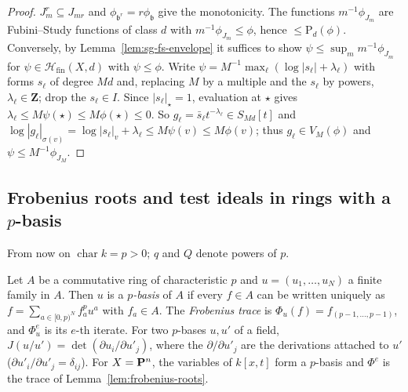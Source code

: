 \begin{proof}
$J_m^r\subseteq J_{mr}$ and $\phi_{\mathfrak b^r}=r\phi_{\mathfrak b}$ give the monotonicity. The functions $m^{-1}\phi_{J_m}$ are Fubini--Study functions of
class $d$ with $m^{-1}\phi_{J_m}\le\phi$, hence $\le\mathrm P_d(\phi)$. Conversely, by Lemma~\ref{lem:sg-fs-envelope} it suffices to show
$\psi\le\sup_mm^{-1}\phi_{J_m}$ for $\psi\in\mathcal H_{\mathrm{fin}}(X,d)$ with $\psi\le\phi$. Write $\psi=M^{-1}\max_\ell(\log|s_\ell|+\lambda_\ell)$ with forms
$s_\ell$ of degree $Md$ and, replacing $M$ by a multiple and the $s_\ell$ by powers, $\lambda_\ell\in\mathbf{Z}$; drop the $s_\ell\in I$. Since
$|s_\ell|_\star=1$, evaluation at $\star$ gives $\lambda_\ell\le M\psi(\star)\le M\phi(\star)\le0$. So $g_\ell=\bar s_\ell t^{-\lambda_\ell}\in S_{Md}[t]$ and
$\log|g_\ell|_{\sigma(v)}=\log|s_\ell|_v+\lambda_\ell\le M\psi(v)\le M\phi(v)$; thus $g_\ell\in V_M(\phi)$ and $\psi\le M^{-1}\phi_{J_M}$.
\end{proof}

\subsection{Frobenius roots and test ideals in rings with a \texorpdfstring{$p$}{p}-basis}\label{subsec:sg-pbasis}

From now on $\operatorname{char}k=p>0$; $q$ and $Q$ denote powers of $p$.

\begin{convention}\label{conv:sg-pbasis}
\leanok
{}
Let $A$ be a commutative ring of characteristic $p$ and $u=(u_1,\dots,u_N)$ a finite family in $A$. Then $u$ is a \emph{$p$-basis}
of $A$ if every $f\in A$ can be written uniquely as $f=\sum_{a\in[0,p)^N}f_a^pu^a$ with $f_a\in A$. The \emph{Frobenius trace} is
$\Phi_u(f)=f_{(p-1,\dots,p-1)}$, and $\Phi^e_u$ is its $e$-th iterate. For two $p$-bases $u,u'$ of a field, $J(u/u')=\det(\partial u_i/\partial u'_j)$,
where the $\partial/\partial u'_j$ are the derivations attached to $u'$ ($\partial u'_i/\partial u'_j=\delta_{ij}$). For $X=\mathbf{P}^n$, the variables of
$k[x,t]$ form a $p$-basis and $\Phi^e$ is the trace of Lemma~\ref{lem:frobenius-roots}.
\end{convention}

